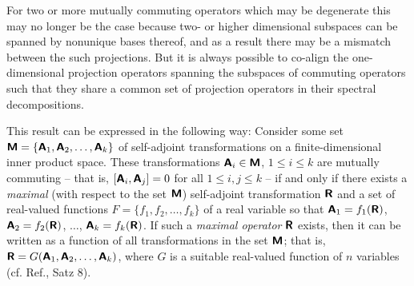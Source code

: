 For two or more mutually commuting operators which may be degenerate this may no longer be the case
because two- or higher dimensional subspaces can be spanned by nonunique bases thereof,
and as a result there may be a mismatch between the such projections.
But it is always possible to co-align the one-dimensional projection operators spanning the subspaces
of commuting operators such that they share a common set of projection operators in their spectral decompositions.



This result can be expressed in the following way:
Consider some set $\textsf{\textbf{M}}
=
\{
\textsf{\textbf{A}}_1,
\textsf{\textbf{A}}_2,
\ldots ,
\textsf{\textbf{A}}_k
\}
$
of  self-adjoint transformations on a finite-dimensional inner product space.
These  transformations  $\textsf{\textbf{A}}_i \in \textsf{\textbf{M}}$, $1\le i \le k$
are mutually commuting -- that is, $[\textsf{\textbf{A}}_i,\textsf{\textbf{A}}_j] =0$ for all $1\le i,j \le k$ -- if and only if there exists
a {\em maximal} (with respect to the set $\textsf{\textbf{M}}$) self-adjoint transformation  $\textsf{\textbf{R}}$ and
a set of real-valued functions
$F
=
\{
f_1,
f_2,
\ldots ,
f_k
\}
$ of a real variable so that
$
\textsf{\textbf{A}}_1=f_1 (\textsf{\textbf{R}})
$,
$
\textsf{\textbf{A}}_2=f_2 (\textsf{\textbf{R}})
$,
$\ldots $,
$\textsf{\textbf{A}}_k=f_k (\textsf{\textbf{R}})$.
If such a {\em maximal operator} $\textsf{\textbf{R}}$ exists, then
it can be written as a function of all transformations in the set $\textsf{\textbf{M}}$; that is,
$\textsf{\textbf{R}}=G(\textsf{\textbf{A}}_1,
\textsf{\textbf{A}}_2,
\ldots ,
\textsf{\textbf{A}}_k)$,
where $G$ is a suitable real-valued function of $n$ variables
(cf. Ref.\cite{v-neumann-31}, Satz 8).

